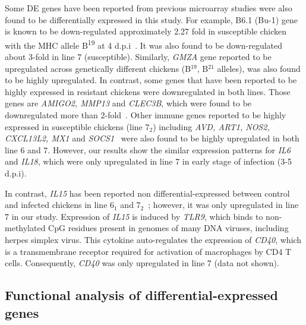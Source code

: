 \documentclass[10pt]{article}
\begin{document}
Some DE genes have been reported from previous microarray studies were also found to be
differentially expressed in this study.
For example, B6.1 (Bu-1) gene is known to be down-regulated approximately 2.27 fold in susceptible
chicken with the MHC allele B\textsuperscript{19} at 4 d.p.i~\cite{sarson2008transcriptional}.
It was also found to be down-regulated about 3-fold in line 7 (susceptible).
Similarly, \textit{GMZA} gene reported to be upregulated across genetically different chickens
(B$^{19}$, B$^{21}$ alleles), was also found to be highly upregulated.
In contrast, some genes that have been reported to be highly expressed in resistant chickens were
downregulated in both lines. Those genes are \textit{AMIGO2, MMP13} and \textit{CLEC3B}, which were
found to be downregulated more than 2-fold~\cite{sarson2008transcriptional}.
Other immune genes reported to be highly expressed in susceptible chickens (line 7$_{2}$) including
\textit{AVD, ART1, NOS2, CXCL13L2, MX1} and \textit{SOCS1}~\cite{smith2011systems}
were also found to be highly upregulated in both line 6 and 7.
However, our results show the similar expression patterns for \textit{IL6} and \textit{IL18}, which were
only upregulated in line 7 in early stage of infection (3-5 d.p.i).

In contrast, \textit{IL15} has been reported non differential-expressed between control
and infected chickens in
line 6$_{1}$ and 7$_{2}$~\cite{kaiser2003differential}; however,
it was only upregulated in line 7 in our study.
Expression of \textit{IL15} is induced by \textit{TLR9}, which binds to non-methylated CpG
residues present in genomes of many DNA viruses, including herpes simplex virus.
This cytokine auto-regulates the expression of \textit{CD40}, which is
a transmembrane receptor required for activation of macrophages by CD4 T cells.
Consequently, \textit{CD40} was only upregulated in line 7 (data not shown).


\subsection*{Functional analysis of differential-expressed genes}
\end{document}
